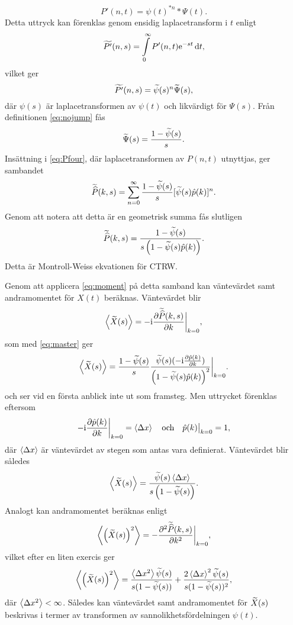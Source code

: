 \begin{equation}
P'(n,t) = \psi(t)^{*n}*\Psi(t).
\end{equation}
Detta uttryck kan förenklas genom ensidig laplacetransform i $t$ enligt 
\begin{equation}
\PPs (n,s) = \int_0^\infty P'(n,t)\ee^{-st}\id{t},
\end{equation}
vilket ger 
\begin{equation}
\widetilde{P'} (n,s) = \widetilde{\psi}(s)^n\widetilde{\Psi}(s),
\end{equation}
där $\psi(s)$ är laplacetransformen av $\psi(t)$ och likvärdigt för $\Psi(s)$. Från definitionen \eqref{eq:nojump} fås 
\begin{equation}
\widetilde{\Psi}(s) = \frac{1-\widetilde{\psi} (s)}{s}.
\end{equation}
Insättning i \eqref{eq:Pfour}, där laplacetransformen av $P(n,t)$ utnyttjas, ger sambandet 
\begin{equation}
\widetilde{\widehat{P}} (k,s) = \sum_{n=0}^{\infty} \frac{1-\widetilde{\psi} (s)}{s}[\widetilde{\psi} (s)\hat{p} (k)]^n.
\end{equation}
Genom att notera att detta är en geometrisk summa fås slutligen 
\begin{equation}\label{eq:master}
\widetilde{\widehat{P}} (k,s) = \frac{1-\widetilde{\psi} (s)}{s\left(1-\widetilde{\psi} (s)\hat{p} (k)\right)}.
\end{equation}
Detta är Montroll-Weiss ekvationen för CTRW.

Genom att applicera \eqref{eq:moment} på detta samband kan väntevärdet samt andramomentet för $X(t)$ beräknas. Väntevärdet blir 
\begin{equation}
\ev{\Xs} = -\ii\frac{\pd \Pks (k,s)}{\pd k}\bigg |_{k=0},
\end{equation}
som med \eqref{eq:master} ger 
\begin{equation}
\ev{\Xs} = \frac{1-\psis (s)}{s}\frac{\psis (s)(-\ii\frac{\pd \pk (k)}{\pd k})}{\left(1-\psis (s)\pk (k)\right)^2}\bigg |_{k=0}.
\end{equation}
och ser vid en första anblick inte ut som framsteg. Men uttrycket förenklas eftersom
\begin{equation}
-\ii\frac{\pd \pk (k)}{\pd k}\bigg |_{k=0} = \ev{\Delta x}\quad\text{och}\quad\pk (k)\big |_{k=0} = 1,
\end{equation}
där $\ev{\Delta x}$ är väntevärdet av stegen som antas vara definierat.
Väntevärdet blir således 
\begin{equation}\label{eq:medels}
\ev{\Xs} = \frac{\psis (s)\ev{\Delta x}}{s\left(1-\psis (s)\right)}.
\end{equation}
Analogt kan andramomentet beräknas enligt 
\begin{equation}
\ev{\left(\Xs\right)^2} = -\frac{\pd^2 \Pks (k,s)}{\pd k^2}\bigg |_{k=0},
\end{equation}
vilket efter en liten exercis ger
\begin{equation}\label{eq:vars}
\ev{\left(\Xs\right)^2} = \frac{\ev{\Delta x^2}\psis (s)}{s(1-\psis (s))}+\frac{2\ev{\Delta x}^2\psis (s)}{s(1-\psis (s))^2},
\end{equation}
där $\ev{\Delta x^2}< \infty$. Således kan väntevärdet samt andramomentet för $\widetilde{X}(s)$ beskrivas i termer av transformen av sannolikhetsfördelningen $\psi(t)$.


